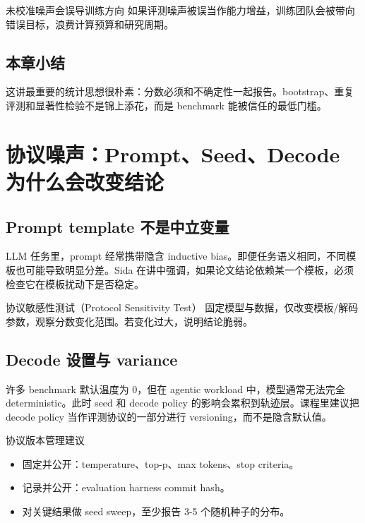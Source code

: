 \documentclass[a4paper]{article}
\begin{document}
\begin{warningbox}{未校准噪声会误导训练方向}
如果评测噪声被误当作能力增益，训练团队会被带向错误目标，浪费计算预算和研究周期。
\end{warningbox}

\subsection{本章小结}
这讲最重要的统计思想很朴素：分数必须和不确定性一起报告。bootstrap、重复评测和显著性检验不是锦上添花，而是 benchmark 能被信任的最低门槛。

\section{协议噪声：Prompt、Seed、Decode 为什么会改变结论}

\subsection{Prompt template 不是中立变量}
LLM 任务里，prompt 经常携带隐含 inductive bias。即便任务语义相同，不同模板也可能导致明显分差。Sida 在讲中强调，如果论文结论依赖某一个模板，必须检查它在模板扰动下是否稳定。

\begin{knowledgebox}{协议敏感性测试（Protocol Sensitivity Test）}
固定模型与数据，仅改变模板/解码参数，观察分数变化范围。若变化过大，说明结论脆弱。
\end{knowledgebox}

\subsection{Decode 设置与 variance}
许多 benchmark 默认温度为 0，但在 agentic workload 中，模型通常无法完全 deterministic。此时 seed 和 decode policy 的影响会累积到轨迹层。课程里建议把 decode policy 当作评测协议的一部分进行 versioning，而不是隐含默认值。

\begin{importantbox}{协议版本管理建议}
\begin{itemize}
    \item 固定并公开：temperature、top-p、max tokens、stop criteria。
    \item 记录并公开：evaluation harness commit hash。
    \item 对关键结果做 seed sweep，至少报告 3-5 个随机种子的分布。
\end{itemize}
\end{importantbox}
\end{document}

